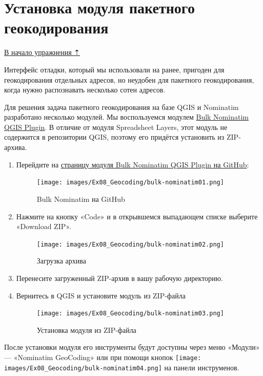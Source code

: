 \documentclass[
  12pt,
]{book}
\begin{document}
\hypertarget{geocoding-batch-install}{%
\section{Установка модуля пакетного геокодирования}\label{geocoding-batch-install}}

\protect\hyperlink{geocoding}{В начало упражнения ⇡}

Интерфейс отладки, который мы использовали на ранее, пригоден для геокодирования отдельных адресов, но неудобен для пакетного геокодирования, когда нужно распознавать несколько сотен адресов.

Для решения задача пакетного геокодирования на базе QGIS и Nominatim разработано несколько модулей. Мы воспользуемся модулем \href{https://github.com/NationalSecurityAgency/qgis-bulk-nominatim}{Bulk Nominatim QGIS Plugin}. В отличие от модуля Spreadsheet Layers, этот модуль не содержится в репозитории QGIS, поэтому его придётся установить из ZIP-архива.

\begin{enumerate}
\def\labelenumi{\arabic{enumi}.}
\item
  Перейдите на \href{https://github.com/NationalSecurityAgency/qgis-bulk-nominatim}{страницу модуля Bulk Nominatim QGIS Plugin на GitHub}:

  \begin{figure}
  \centering
  \texttt{[image: images/Ex08\_Geocoding/bulk-nominatim01.png]}
  \caption{Bulk Nominatim на GitHub}
  \end{figure}
\item
  Нажмите на кнопку «Code» и в открывшемся выпадающем списке выберите «Download ZIP».

  \begin{figure}
  \centering
  \texttt{[image: images/Ex08\_Geocoding/bulk-nominatim02.png]}
  \caption{Загрузка архива}
  \end{figure}
\item
  Перенесите загруженный ZIP-архив в вашу рабочую директорию.
\item
  Вернитесь в QGIS и установите модуль из ZIP-файла

  \begin{figure}
  \centering
  \texttt{[image: images/Ex08\_Geocoding/bulk-nominatim03.png]}
  \caption{Установка модуля из ZIP-файла}
  \end{figure}
\end{enumerate}

После установки модуля его инструменты будут доступны через меню «Модули» --- «Nominatim GeoCoding» или при помощи кнопок \texttt{[image: images/Ex08\_Geocoding/bulk-nominatim04.png]} на панели инструменов.
\end{document}
